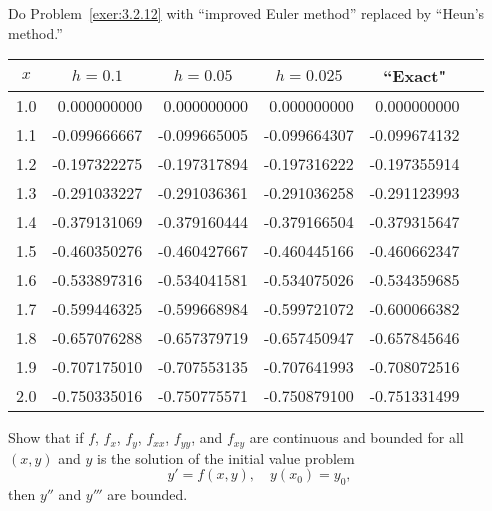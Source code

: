 \documentclass{ximera}
\begin{document}
\begin{problem}\label{exer:3.2.30} 
Do Problem~\ref{exer:3.2.12} with ``improved Euler method''
replaced by ``Heun's method.''

\begin{solution}
    {\small
\begin{tabular}{|c|r|r|r|r|r|}
\hline
\multicolumn{1}{|c|}{$x$}&
\multicolumn{1}{|c|}{$h=0.1$}&
\multicolumn{1}{|c|}{$h=0.05$}&
\multicolumn{1}{|c|}{$h=0.025$}&
\multicolumn{1}{|c|}{``Exact"}\\ \hline
1.0 & 0.000000000 & 0.000000000  &  0.000000000 &  0.000000000 \\
1.1 &-0.099666667 &-0.099665005  & -0.099664307 & -0.099674132 \\
1.2 &-0.197322275 &-0.197317894  & -0.197316222 & -0.197355914 \\
1.3 &-0.291033227 &-0.291036361  & -0.291036258 & -0.291123993 \\
1.4 &-0.379131069 &-0.379160444  & -0.379166504 & -0.379315647 \\
1.5 &-0.460350276 &-0.460427667  & -0.460445166 & -0.460662347 \\
1.6 &-0.533897316 &-0.534041581  & -0.534075026 & -0.534359685 \\
1.7 &-0.599446325 &-0.599668984  & -0.599721072 & -0.600066382 \\
1.8 &-0.657076288 &-0.657379719  & -0.657450947 & -0.657845646 \\
1.9 &-0.707175010 &-0.707553135  & -0.707641993 & -0.708072516 \\
2.0 &-0.750335016 &-0.750775571  & -0.750879100 & -0.751331499 \\
\hline
\end{tabular}}
\end{solution}
\end{problem}

\begin{problem}\label{exer:3.2.31}
Show that if $f$, $f_x$, $f_y$, $f_{xx}$, $f_{yy}$, and $f_{xy}$ are
continuous and bounded for all $(x,y)$ and $y$ is the solution of the
initial value problem
$$
y'=f(x,y),\quad y(x_0)=y_0,
$$
then $y''$ and $y'''$ are bounded.
\end{problem}
\end{document}
